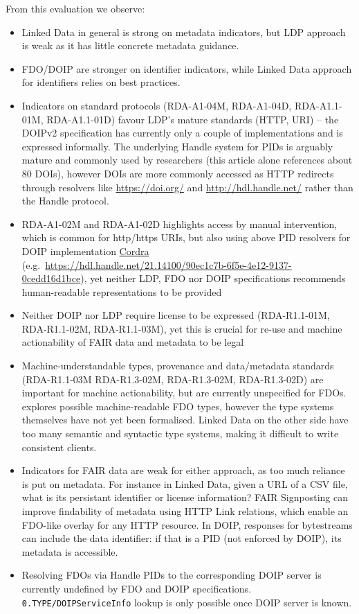 From this evaluation we observe:

\begin{itemize}
\item
  Linked Data in general is strong on metadata indicators, but LDP approach is weak as it has little concrete metadata guidance.
\item
  FDO/DOIP are stronger on identifier indicators, while Linked Data approach for identifiers relies on best practices. 
\item
  Indicators on standard protocols (RDA-A1-04M, RDA-A1-04D, RDA-A1.1-01M, RDA-A1.1-01D) favour LDP's mature standards (HTTP, URI) -- the DOIPv2 specification \cite{DONA 2018} has currently only a couple of implementations and is expressed informally. The underlying Handle system for PIDs is arguably mature and commonly used by researchers (this article alone references about 80 DOIs), however DOIs are more commonly accessed as HTTP redirects through resolvers like \url{https://doi.org/} and \url{http://hdl.handle.net/} rather than the Handle protocol.
\item
  RDA-A1-02M and RDA-A1-02D highlights access by manual intervention, which is common for http/https URIs, but also using above PID resolvers for DOIP implementation \href{https://www.cordra.org/}{Cordra} (e.g.~\url{https://hdl.handle.net/21.14100/90ec1c7b-6f5e-4e12-9137-0cedd16d1bce}), yet neither LDP, FDO nor DOIP specifications recommends human-readable representations to be provided
\item
  Neither DOIP nor LDP require license to be expressed (RDA-R1.1-01M, RDA-R1.1-02M, RDA-R1.1-03M), yet this is crucial for re-use and machine actionability of FAIR data and metadata to be legal
\item
  Machine-understandable types, provenance and data/metadata standards (RDA-R1.1-03M RDA-R1.3-02M, RDA-R1.3-02M, RDA-R1.3-02D) are important for machine actionability, but are currently unspecified for FDOs. \cite{fdo-ImplAttributesTypesProfiles} explores possible machine-readable FDO types, however the type systems themselves have not yet been formalised. Linked Data on the other side have too many semantic and syntactic type systems, making it difficult to write consistent clients.
\item
  Indicators for FAIR data are weak for either approach, as too much reliance is put on metadata. For instance in Linked Data, given a URL of a CSV file, what is its persistant identifier or license information? FAIR Signposting \cite{Van de Sompel 2022} can improve findability of metadata using HTTP Link relations, which enable an FDO-like overlay for any HTTP resource. In DOIP, responses for bytestreams can include the data identifier: if that is a PID (not enforced by DOIP), its metadata is accessible.
\item
  Resolving FDOs via Handle PIDs to the corresponding DOIP server is currently undefined by FDO and DOIP specifications. \texttt{0.TYPE/DOIPServiceInfo} lookup is only possible once DOIP server is known.
\end{itemize}



